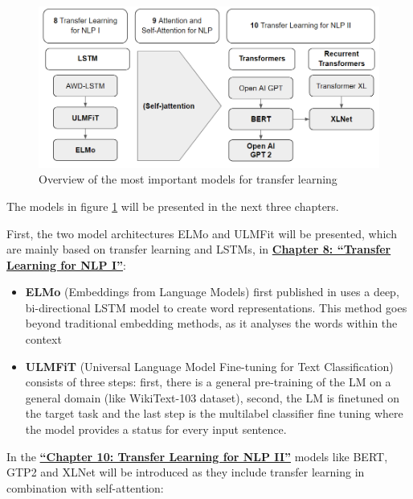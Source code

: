 \documentclass[]{krantz}
\begin{document}
\begin{figure}

{\centering \includegraphics[width=0.7\linewidth]{figures/02-00-transfer-learning-for-nlp/overview-tranferlearning} 

}

\caption{Overview of the most important models for transfer learning}\label{fig:ch02-figure02}
\end{figure}



The models in figure \ref{fig:ch02-figure02} will be presented in the next three chapters.

First, the two model architectures ELMo and ULMFit will be presented, which are mainly based on transfer learning and LSTMs, in \protect\hyperlink{Transfer-Learning-for-NLP-I}{\textbf{Chapter 8: ``Transfer Learning for NLP I''}}:

\begin{itemize}
\item
  \textbf{ELMo} (Embeddings from Language Models) first published in \citet{elmopaper} uses a deep, bi-directional LSTM model to create word representations. This method goes beyond traditional embedding methods, as it analyses the words within the context
\item
  \textbf{ULMFiT} (Universal Language Model Fine-tuning for Text Classification) consists of three steps: first, there is a general pre-training of the LM on a general domain (like WikiText-103 dataset), second, the LM is finetuned on the target task and the last step is the multilabel classifier fine tuning where the model provides a status for every input sentence.
\end{itemize}

In the \protect\hyperlink{Transfer-Learning-for-NLP-II}{\textbf{``Chapter 10: Transfer Learning for NLP II''}} models like BERT, GTP2 and XLNet will be introduced as they include transfer learning in combination with self-attention:
\end{document}
